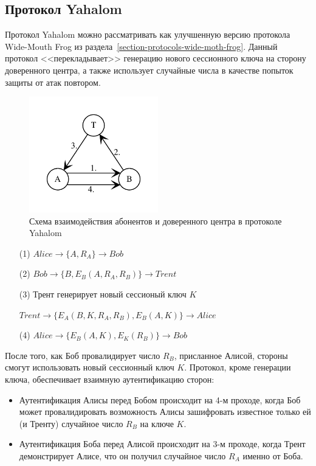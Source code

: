 \subsection{Протокол Yahalom}\label{section-protocols-yahalom}

Протокол Yahalom можно рассматривать как улучшенную версию протокола Wide-Mouth Frog из раздела~\ref{section-protocols-wide-moth-frog}. Данный протокол <<перекладывает>> генерацию нового сессионного ключа на сторону доверенного центра, а также использует случайные числа в качестве попыток защиты от атак повтором.

\begin{figure}[!htb]
    \centering
    \includegraphics[width=0.5\textwidth]{pic/key_distribution-yahalom}
    \caption{Схема взаимодействия абонентов и доверенного центра в протоколе Yahalom\label{fig:key_distribution-yahalom}}
\end{figure}

\begin{itemize}
	\item[(1)] $Alice \to \{ A, R_A \} \to Bob$
	\item[(2)] $Bob \to \{ B, E_B( A, R_A, R_B ) \} \to Trent$
	\item[(3)] Трент генерирует новый сессионый ключ $K$
	\item[{}] $Trent \to \{ E_A( B, K, R_A, R_B ), E_B(A, K) \} \to Alice$
	\item[(4)] $Alice \to \{ E_B( A, K ), E_K( R_B ) \} \to Bob$
\end{itemize}

После того, как Боб провалидирует число $R_B$, присланное Алисой, стороны смогут использовать новый сессионный ключ $K$. Протокол, кроме генерации ключа, обеспечивает взаимную аутентификацию сторон:

\begin{itemize}
    \item Аутентификация Алисы перед Бобом происходит на 4-м проходе, когда Боб может провалидировать возможность Алисы зашифровать известное только ей (и Тренту) случайное число $R_B$ на ключе $K$.
    \item Аутентификация Боба перед Алисой происходит на 3-м проходе, когда Трент демонстрирует Алисе, что он получил случайное число $R_A$ именно от Боба.
\end{itemize}

